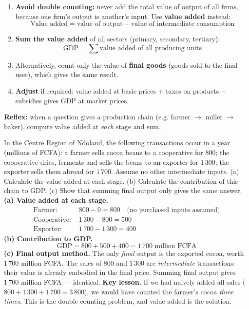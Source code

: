\documentclass[11pt]{article}
\newcommand{\cle}[1]{{\popxbold\color{popdark}#1}}
\begin{document}
\begin{methode}
\begin{enumerate}
\item \textbf{Avoid double counting:} never add the total value of output of all firms, because one firm's output is another's input. Use \textbf{value added} instead:
\[ \text{Value added} = \text{value of output} - \text{value of intermediate consumption} \]
\item \textbf{Sum the value added} of all sectors (primary, secondary, tertiary):
\[ \mathrm{GDP} = \sum \text{value added of all producing units} \]
\item Alternatively, count only the value of \textbf{final goods} (goods sold to the final user), which gives the same result.
\item \textbf{Adjust} if required: value added at basic prices $+$ taxes on products $-$ subsidies gives GDP at market prices.
\end{enumerate}
\textbf{Reflex:} when a question gives a production chain (e.g. farmer $\to$ miller $\to$ baker), compute value added at \emph{each} stage and sum.
\end{methode}

\begin{exoresolu}
In the Centre Region of Ndoland, the following transactions occur in a year (millions of FCFA): a farmer sells cocoa beans to a cooperative for $800$; the cooperative dries, ferments and sells the beans to an exporter for $1\,300$; the exporter sells them abroad for $1\,700$. Assume no other intermediate inputs.
(a) Calculate the value added at each stage. (b) Calculate the contribution of this chain to GDP. (c) Show that summing final output only gives the same answer.
\tcblower
\textbf{(a) Value added at each stage.}
\begin{align*}
\text{Farmer: } & 800 - 0 = 800 \quad \text{(no purchased inputs assumed)}\\
\text{Cooperative: } & 1\,300 - 800 = 500\\
\text{Exporter: } & 1\,700 - 1\,300 = 400
\end{align*}
\textbf{(b) Contribution to GDP.}
\[ \mathrm{GDP} = 800 + 500 + 400 = 1\,700 \text{ million FCFA} \]
\textbf{(c) Final output method.} The only \emph{final} output is the exported cocoa, worth $1\,700$ million FCFA. The sales of $800$ and $1\,300$ are \emph{intermediate} transactions: their value is already embodied in the final price. Summing final output gives $1\,700$ million FCFA — identical.
\textbf{Key lesson.} If we had naively added all sales ($800 + 1\,300 + 1\,700 = 3\,800$), we would have counted the farmer's cocoa \emph{three times}. This is the \cle{double counting} problem, and value added is the solution.
\end{exoresolu}
\end{document}
